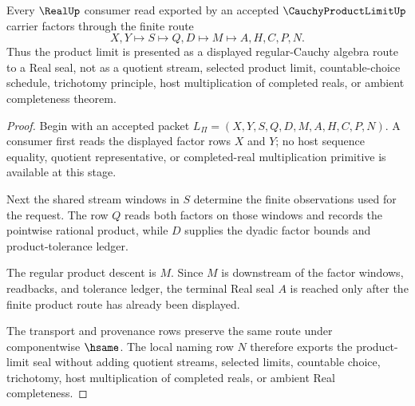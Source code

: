 \begin{theorem}
\label{thm:cauchy-product-limit-real-seal-route}
Every $\RealUp$ consumer read exported by an accepted $\CauchyProductLimitUp$ carrier factors through the finite route
$$
X,Y \longmapsto S \longmapsto Q,D \longmapsto M \longmapsto A,H,C,P,N .
$$
Thus the product limit is presented as a displayed regular-Cauchy algebra route to a Real seal, not as a quotient stream, selected product limit, countable-choice schedule, trichotomy principle, host multiplication of completed reals, or ambient completeness theorem.
\end{theorem}
\begin{proof}
Begin with an accepted packet $L_{\Pi}=(X,Y,S,Q,D,M,A,H,C,P,N)$. A consumer first reads the displayed factor rows $X$ and $Y$; no host sequence equality, quotient representative, or completed-real multiplication primitive is available at this stage.

Next the shared stream windows in $S$ determine the finite observations used for the request. The row $Q$ reads both factors on those windows and records the pointwise rational product, while $D$ supplies the dyadic factor bounds and product-tolerance ledger.

The regular product descent is $M$. Since $M$ is downstream of the factor windows, readbacks, and tolerance ledger, the terminal Real seal $A$ is reached only after the finite product route has already been displayed.

The transport and provenance rows preserve the same route under componentwise $\hsame$. The local naming row $N$ therefore exports the product-limit seal without adding quotient streams, selected limits, countable choice, trichotomy, host multiplication of completed reals, or ambient Real completeness.
\end{proof}

